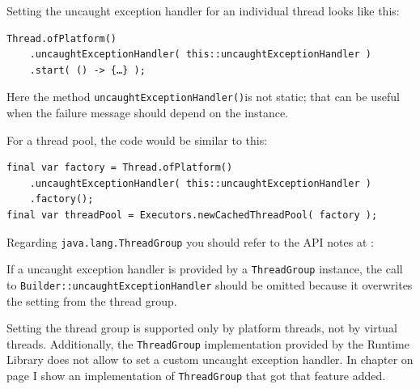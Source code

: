 Setting the uncaught exception handler for an individual thread looks like this:
\begin{lstlisting}
Thread.ofPlatform()
    .uncaughtExceptionHandler( this::uncaughtExceptionHandler )
    .start( () -> {…} );
\end{lstlisting}
Here the method \lstinline|uncaughtExceptionHandler()|is not static; that can be useful when the failure message should depend on the instance.

For a thread pool, the code would be similar to this:
\begin{lstlisting}
final var factory = Thread.ofPlatform()
    .uncaughtExceptionHandler( this::uncaughtExceptionHandler )
    .factory();
final var threadPool = Executors.newCachedThreadPool( factory );
\end{lstlisting}

Regarding \lstinline|java.lang.ThreadGroup| you should refer to the API notes at \autocite{ORACLE_DOC_THREADGROUP_CLASS}:
\begin{quotation}
\end{quotation}

If a uncaught exception handler is provided by a \lstinline|ThreadGroup| instance, the call to \lstinline|Builder::uncaughtExceptionHandler| should be omitted because it overwrites the setting from the thread group.

Setting the thread group is supported only by platform threads, not by virtual threads. Additionally, the \lstinline|ThreadGroup| implementation provided by the \Java Runtime Library does not allow to set a custom uncaught exception handler. In chapter  on page \pageref{sec:ThreadGroup} I show an implementation of \lstinline|ThreadGroup| that got that feature added.

